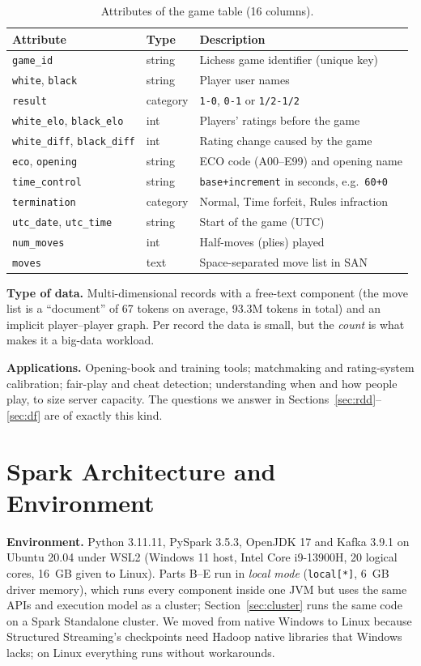 \documentclass[11pt,a4paper]{article}
\begin{document}
\begin{table}[H]\centering\small
\caption{Attributes of the game table (16 columns).}
\begin{tabular}{@{}lll@{}}\toprule
Attribute & Type & Description\\\midrule
\texttt{game\_id} & string & Lichess game identifier (unique key)\\
\texttt{white}, \texttt{black} & string & Player user names\\
\texttt{result} & category & \texttt{1-0}, \texttt{0-1} or \texttt{1/2-1/2}\\
\texttt{white\_elo}, \texttt{black\_elo} & int & Players' ratings before the game\\
\texttt{white\_diff}, \texttt{black\_diff} & int & Rating change caused by the game\\
\texttt{eco}, \texttt{opening} & string & ECO code (A00--E99) and opening name\\
\texttt{time\_control} & string & \texttt{base+increment} in seconds, e.g.\ \texttt{60+0}\\
\texttt{termination} & category & Normal, Time forfeit, Rules infraction\\
\texttt{utc\_date}, \texttt{utc\_time} & string & Start of the game (UTC)\\
\texttt{num\_moves} & int & Half-moves (plies) played\\
\texttt{moves} & text & Space-separated move list in SAN\\\bottomrule
\end{tabular}\end{table}

\textbf{Type of data.} Multi-dimensional records with a free-text component (the move
list is a ``document'' of 67 tokens on average, 93.3M tokens in total) and an implicit
player--player graph. Per record the data is small, but the \emph{count} is what makes
it a big-data workload.

\textbf{Applications.} Opening-book and training tools; matchmaking and rating-system
calibration; fair-play and cheat detection; understanding when and how people play, to
size server capacity. The questions we answer in Sections~\ref{sec:rdd}--\ref{sec:df}
are of exactly this kind.

\section{Spark Architecture and Environment}
\textbf{Environment.} Python 3.11.11, PySpark 3.5.3, OpenJDK 17 and Kafka 3.9.1 on Ubuntu
20.04 under WSL2 (Windows 11 host, Intel Core i9-13900H, 20 logical cores, 16~GB given to
Linux). Parts B--E run in \emph{local mode} (\texttt{local[*]}, 6~GB driver memory), which runs
every component inside one JVM but uses the same APIs and execution model as a cluster;
Section~\ref{sec:cluster} runs the same code on a Spark Standalone cluster. We moved from
native Windows to Linux because Structured Streaming's checkpoints need Hadoop native
libraries that Windows lacks; on Linux everything runs without workarounds.
\end{document}
